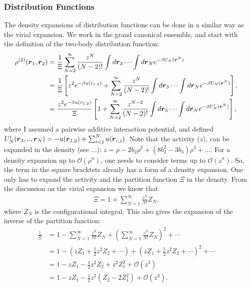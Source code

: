 \subsubsection{Distribution Functions}
The density expansions of distribution functions can be done in a similar way as the virial expansion.
We work in the grand canonical ensemble, and start with the 
definition of the two-body distribution function:
\begin{align}
\rho^{(2)} (\boldsymbol{r}_1,\boldsymbol{r}_2) &= \frac{1}{\Xi} \sum_{N=2}^\infty
    \frac{z^N}{(N-2)!} \int d\boldsymbol{r}_3 \cdots \int d\boldsymbol{r}_N
    e^{-\beta U_N(\boldsymbol{r}^N)}\\
&= \frac{1}{\Xi} \left[ z^2 e^{-\beta u(r_{1,2})} +
  \sum_{N=2}^\infty \frac{z^N}{(N-2)!} \int d\boldsymbol{r}_3 \cdots \int d\boldsymbol{r}_N
    e^{-\beta U_N(\boldsymbol{r}^N)} \right],\\
&=  \frac{z^2 e^{-\beta u(r_{1,2})}}{\Xi} \left[ 1 +
  \sum_{N=2}^\infty \frac{z^{N-2}}{(N-2)!} \int d\boldsymbol{r}_3 \cdots \int d\boldsymbol{r}_N
    e^{-\beta U'_N(\boldsymbol{r}^N)} \right],
\label{eq:rho2_exp1}
\end{align}
where I assumed a pairwise additive interaction potential, and defined $U'_N(\boldsymbol{r}_3,..,\boldsymbol{r}_N) = -u(\boldsymbol{r}_{1,2}) + \sum_{i<j}^N
u(\boldsymbol{r}_{i,j})$.
Note that the activity ($z$), can be expanded in the density (see ...): $z = \rho -2b_2 \rho^2 +(8b_2^2 - 3b_3) \rho^3 + ...$.
For a density expansion up to $\mathcal{O}(\rho^n)$,
one needs to consider terms up to $\mathcal{O}(z^n)$.
So, the term in the square bracktets already has a form of a density expansion.
One only has to expand the activity and the partition function $\Xi$ in the density.
From the discussion on the virial expansion  we know that
\begin{align}
\Xi = 1 + \sum_{N=1}^{\infty} \frac{z^N}{N!} Z_N,
\end{align}
where $Z_N$ is the configurational integral.
This also gives the expansion of the inverse of the partition function:
\begin{align}
\frac{1}{\Xi} &= 1 - \sum_{N=1}^{\infty} \frac{z^N}{N!} Z_N +
    \left( \sum_{N=1}^{\infty} \frac{z^N}{N!} Z_N \right)^2 + \cdots \\
&= 1 - \left( z Z_1 + \frac{1}{2} z^2 Z_2 + \cdots \right) +
    \left(z Z_1 + \frac{1}{2} z^2 Z_2 + \cdots \right)^2 + \cdots \\
&= 1 - zZ_1  - \frac{1}{2} z^2 Z_2 + z^2 Z_1^2 + \mathcal{O}(z^3) \\
&= 1 - z Z_1 - \frac{1}{2} z^2 \left( Z_2 - 2 Z_1^2 \right) +
    \mathcal{O}(z^3).
\label{eq:xi_exp}
\end{align}

